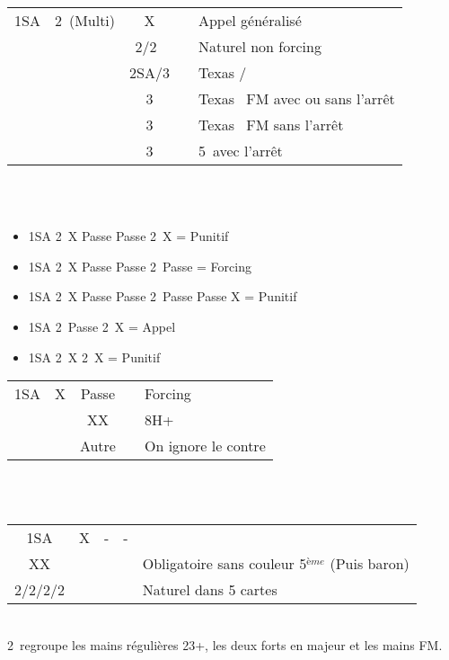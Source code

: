 \documentclass[a4paper, oneside, 11pt]{report}
\begin{document}
		\begin{tabular}{cccc|l}
		1SA & 2\carreau\ (Multi) & X && Appel généralisé\\
		&& 2\coeur/2\pique\ && Naturel non forcing\\
		&& 2SA/3\trefle && Texas \trefle/\carreau\\
		&& 3\carreau && Texas \coeur\ FM avec ou sans l'arrêt \pique\\
		&& 3\coeur && Texas \pique\ FM sans l'arrêt \coeur\\
		&& 3\pique && 5\pique\ avec l'arrêt \coeur\\
		\end{tabular}\\\\

		\begin{itemize}
		\item 1SA 2\carreau\ X Passe Passe 2\coeur\ X  = Punitif
		\item 1SA 2\carreau\ X Passe Passe 2\coeur\ Passe  = Forcing
		\item 1SA 2\carreau\ X Passe Passe 2\coeur\ Passe  Passe X = Punitif
		\item 1SA 2\carreau\ Passe 2\coeur\ X = Appel
		\item 1SA 2\carreau\ X 2\coeur\ X = Punitif\\
		\end{itemize}

		\begin{tabular}{cccc|l}
		1SA & X & Passe && Forcing\\
		&& XX && 8H+\\
                  && Autre && On ignore le contre\\
		\end{tabular}\\\\

		\begin{tabular}{cccc|l}
		1SA & X & - & - & \\
                  XX &&&& Obligatoire sans couleur 5$^{ème}$ (Puis baron)\\
		2\trefle/2\carreau/2\coeur/2\pique &&&& Naturel dans 5 cartes\\
		\end{tabular}\\

	2\trefle\ regroupe les mains régulières 23+, les deux forts en majeur et les mains FM.\\
	
\end{document}
